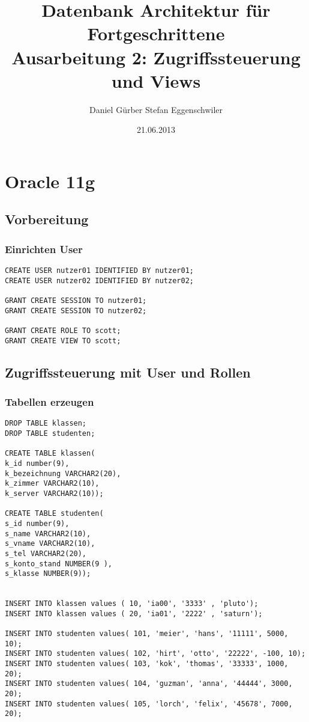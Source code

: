 \documentclass[10pt]{scrreprt}
\title{
\vspace{4cm}
\huge{Datenbank Architektur für Fortgeschrittene}\\
\vspace{0.2cm}
\Large{Ausarbeitung 2: Zugriffssteuerung und Views}\\
}
\author{Daniel Gürber \cr Stefan Eggenschwiler}
\date{21.06.2013}
\begin{document}
\maketitle
\thispagestyle{fancy}

\newpage

\tableofcontents	


\newpage
\setcounter{page}{1}

\chapter{Oracle 11g}
\section{Vorbereitung}
\subsection{Einrichten User}
\begin{lstlisting}[style=sql]
CREATE USER nutzer01 IDENTIFIED BY nutzer01;
CREATE USER nutzer02 IDENTIFIED BY nutzer02;

GRANT CREATE SESSION TO nutzer01;
GRANT CREATE SESSION TO nutzer02;

GRANT CREATE ROLE TO scott;
GRANT CREATE VIEW TO scott;
\end{lstlisting}

\section{Zugriffssteuerung mit User und Rollen}
\subsection{Tabellen erzeugen}
\begin{lstlisting}[style=sql]
DROP TABLE klassen;
DROP TABLE studenten;

CREATE TABLE klassen(
k_id number(9),
k_bezeichnung VARCHAR2(20),
k_zimmer VARCHAR2(10),
k_server VARCHAR2(10));

CREATE TABLE studenten(
s_id number(9),
s_name VARCHAR2(10),
s_vname VARCHAR2(10),
s_tel VARCHAR2(20),
s_konto_stand NUMBER(9 ),
s_klasse NUMBER(9));


INSERT INTO klassen values ( 10, 'ia00', '3333' , 'pluto');
INSERT INTO klassen values ( 20, 'ia01', '2222' , 'saturn');

INSERT INTO studenten values( 101, 'meier', 'hans', '11111', 5000, 10);
INSERT INTO studenten values( 102, 'hirt', 'otto', '22222', -100, 10);
INSERT INTO studenten values( 103, 'kok', 'thomas', '33333', 1000, 20);
INSERT INTO studenten values( 104, 'guzman', 'anna', '44444', 3000, 20);
INSERT INTO studenten values( 105, 'lorch', 'felix', '45678', 7000, 20);
\end{lstlisting}
\end{document}
